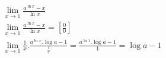 \begin{ex}
\begin{align}
&\lim_{x\rightarrow 1} \frac{a^{\ln{x}}-x}{\ln{x}}\nonumber\\
&\lim_{x\rightarrow 1} \frac{a^{\ln{x}}-x}{\ln{x}}=\left[\frac{0}{0}\right]\nonumber\\
&\lim_{x\rightarrow 1} \frac{1}{x}.\frac{a^{\ln{x}}.\log{a}-1}{\frac{1}{x}}=\frac{a^{\ln{1}}.\log{a}-1}{1}=\log{a}-1\nonumber
\end{align}
\end{ex}